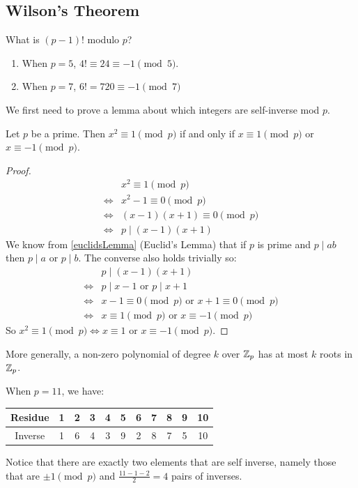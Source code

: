 \documentclass[../main.tex]{subfiles}
\begin{document}
\subsection{Wilson's Theorem}
What is $(p - 1)!$ modulo $p$?
\begin{example}
  \begin{enumerate}
    \item When $p = 5$, $4! \equiv 24 \equiv -1 \pmod{5}$.
    \item When $p = 7$, $6! = 720 \equiv -1 \pmod{7}$
  \end{enumerate}
\end{example}
We first need to prove a lemma about which integers are self-inverse mod $p$.
\begin{lemma}
  Let $p$ be a prime.
  Then $x^2 \equiv 1 \pmod{p}$ if and only if $x \equiv 1 \pmod{p}$ or $x \equiv -1 \pmod{p}$. \label{selfInverseLemma}
\end{lemma}
\begin{proof}
  \begin{align*}
    &x^2 \equiv 1 \pmod{p} \\
    \iff& x^2 - 1 \equiv 0 \pmod{p} \\
    \iff& (x - 1)(x + 1) \equiv 0 \pmod{p} \\
    \iff& p \mid (x - 1)(x + 1)
  \end{align*}
  We know from \cref{euclidsLemma} (Euclid's Lemma) that if $p$ is prime and $p \mid ab$ then $p \mid a$ or $p \mid b$.
  The converse also holds trivially so:
  \begin{align*}
    &p \mid (x - 1)(x + 1) \\
    \iff& p \mid x - 1 \text{ or } p \mid x + 1 \\
    \iff& x - 1 \equiv 0 \pmod{p} \text{ or } x + 1 \equiv 0 \pmod{p} \\
    \iff& x \equiv 1 \pmod{p} \text{ or } x \equiv -1 \pmod{p}
  \end{align*}
  So $x^2 \equiv 1 \pmod{p} \iff x \equiv 1 \text{ or } x \equiv -1 \pmod{p}$.
\end{proof}
\begin{remark}
  More generally, a non-zero polynomial of degree $k$ over $\mathbb{Z}_p$ has at most $k$ roots in $\mathbb{Z}_p$.
\end{remark}
\begin{example}
  When $p = 11$, we have:
  \begin{center}
  \begin{tabular}{c|c|c|c|c|c|c|c|c|c|c}
  Residue & 1 & 2 & 3 & 4 & 5 & 6 & 7 & 8 & 9 & 10 \\
  \hline
  Inverse & 1 & 6 & 4 & 3 & 9 & 2 & 8 & 7 & 5 & 10
  \end{tabular}
  \end{center}
  Notice that there are exactly two elements that are self inverse, namely those that are $\pm 1 \pmod{p}$ and $\frac{11 - 1 - 2}{2} = 4$ pairs of inverses.
\end{example}
\end{document}
